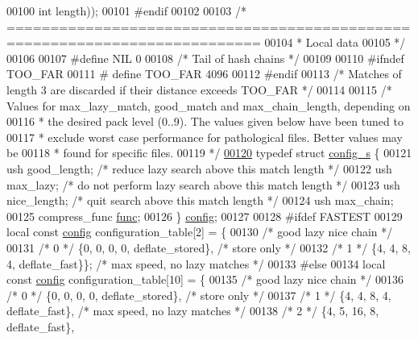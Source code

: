 \begin{DoxyCode}
00100                             \textcolor{keywordtype}{int} length));
00101 \textcolor{preprocessor}{#endif}
00102 
00103 \textcolor{comment}{/* ===========================================================================}
00104 \textcolor{comment}{ * Local data}
00105 \textcolor{comment}{ */}
00106 
00107 \textcolor{preprocessor}{#define NIL 0}
00108 \textcolor{comment}{/* Tail of hash chains */}
00109 
00110 \textcolor{preprocessor}{#ifndef TOO\_FAR}
00111 \textcolor{preprocessor}{#  define TOO\_FAR 4096}
00112 \textcolor{preprocessor}{#endif}
00113 \textcolor{comment}{/* Matches of length 3 are discarded if their distance exceeds TOO\_FAR */}
00114 
00115 \textcolor{comment}{/* Values for max\_lazy\_match, good\_match and max\_chain\_length, depending on}
00116 \textcolor{comment}{ * the desired pack level (0..9). The values given below have been tuned to}
00117 \textcolor{comment}{ * exclude worst case performance for pathological files. Better values may be}
00118 \textcolor{comment}{ * found for specific files.}
00119 \textcolor{comment}{ */}
\hyperlink{structconfig__s}{00120} \textcolor{keyword}{typedef} \textcolor{keyword}{struct }\hyperlink{structconfig__s}{config\_s} \{
00121    ush good\_length; \textcolor{comment}{/* reduce lazy search above this match length */}
00122    ush max\_lazy;    \textcolor{comment}{/* do not perform lazy search above this match length */}
00123    ush nice\_length; \textcolor{comment}{/* quit search above this match length */}
00124    ush max\_chain;
00125    compress\_func \hyperlink{structfunc}{func};
00126 \} \hyperlink{structconfig__s}{config};
00127 
00128 \textcolor{preprocessor}{#ifdef FASTEST}
00129 local \textcolor{keyword}{const} \hyperlink{structconfig__s}{config} configuration\_table[2] = \{
00130 \textcolor{comment}{/*      good lazy nice chain */}
00131 \textcolor{comment}{/* 0 */} \{0,    0,  0,    0, deflate\_stored\},  \textcolor{comment}{/* store only */}
00132 \textcolor{comment}{/* 1 */} \{4,    4,  8,    4, deflate\_fast\}\}; \textcolor{comment}{/* max speed, no lazy matches */}
00133 \textcolor{preprocessor}{#else}
00134 local \textcolor{keyword}{const} \hyperlink{structconfig__s}{config} configuration\_table[10] = \{
00135 \textcolor{comment}{/*      good lazy nice chain */}
00136 \textcolor{comment}{/* 0 */} \{0,    0,  0,    0, deflate\_stored\},  \textcolor{comment}{/* store only */}
00137 \textcolor{comment}{/* 1 */} \{4,    4,  8,    4, deflate\_fast\}, \textcolor{comment}{/* max speed, no lazy matches */}
00138 \textcolor{comment}{/* 2 */} \{4,    5, 16,    8, deflate\_fast\},

\end{DoxyCode}
